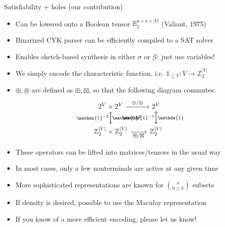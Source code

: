 \documentclass{beamer}
\begin{document}
\begin{frame}[fragile]{Satisfiability + holes (our contribution)}
  \begin{itemize}
    \item Can be lowered onto a Boolean tensor $\mathbb{B}_2^{n\times n \times |V|}$ (Valiant, 1975)
    \item Binarized CYK parser can be efficiently compiled to a SAT solver
    \item Enables sketch-based synthesis in either $\sigma$ or $\mathcal G$: just use variables!
    \item We simply encode the characteristic function, i.e. $\mathds{1}_{\subseteq V}: V\rightarrow \mathbb{Z}_2^{|V|}$
    \item $\oplus, \otimes$ are defined as $\boxplus, \boxtimes$, so that the following diagram commutes:
    \[\begin{tikzcd}
        2^V \times 2^V \arrow[r, "\oplus/\otimes"] \arrow[d, "\mathds{1}^2"]
        & 2^V \arrow[d, "\mathds{1}\phantom{^{-1}}"] \\
        \mathbb{Z}_2^{|V|} \times \mathbb{Z}_2^{|V|} \arrow[r, "\boxplus/\boxtimes", labels=below] \arrow[u, "\mathds{1}^{-2}"]
        & \mathbb{Z}_2^{|V|} \arrow[u, "\mathds{1}^{-1}"]
    \end{tikzcd}\]
    \item These operators can be lifted into matrices/tensors in the usual way
    \item In most cases, only a few nonterminals are active at any given time
    \item More sophisticated representations are known for $\binom{n}{0 \leq k}$ subsets
    \item If density is desired, possible to use the Maculay representation
    \item If you know of a more efficient encoding, please let us know!
  \end{itemize}
\end{frame}
\end{document}
